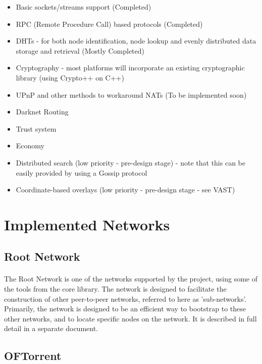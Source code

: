 \documentclass{article}
\begin{document}
\begin{itemize}
\item Basic sockets/streams support (Completed)
\item RPC (Remote Procedure Call) based protocols (Completed)
\item DHTs - for both node identification, node lookup and evenly distributed data storage and retrieval (Mostly Completed)
\item Cryptography - most platforms will incorporate an existing cryptographic library (using Crypto++ on C++)
\item UPnP and other methods to workaround NATs (To be implemented soon)
\item Darknet Routing
\item Trust system
\item Economy
\item Distributed search (low priority - pre-design stage) - note that this can be easily provided by using a Gossip protocol
\item Coordinate-based overlays (low priority - pre-design stage - see VAST)
\end{itemize}

\section{Implemented Networks}

\subsection{Root Network}

\paragraph{}
The Root Network is one of the networks supported by the project, using some of the tools from the core library. The network is designed to facilitate the construction of other peer-to-peer networks, referred to here as 'sub-networks'. Primarily, the network is designed to be an efficient way to bootstrap to these other networks, and to locate specific nodes on the network. It is described in full detail in a separate document.

\subsection{OFTorrent}
\end{document}
